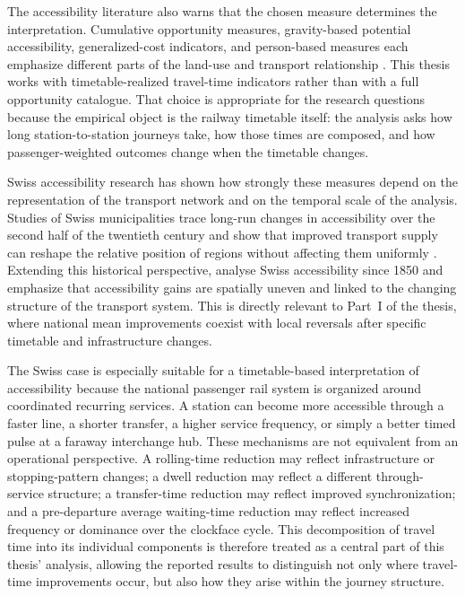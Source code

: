 \documentclass[preprint,12pt]{elsarticle}
\begin{document}
The accessibility literature also warns that the chosen measure determines the interpretation. Cumulative opportunity measures, gravity-based potential accessibility, generalized-cost indicators, and person-based measures each emphasize different parts of the land-use and transport relationship \citep{geurs2004accessibility}. This thesis works with timetable-realized travel-time indicators rather than with a full opportunity catalogue. That choice is appropriate for the research questions because the empirical object is the railway timetable itself: the analysis asks how long station-to-station journeys take, how those times are composed, and how passenger-weighted outcomes change when the timetable changes.

Swiss accessibility research has shown how strongly these measures depend on the representation of the transport network and on the temporal scale of the analysis. Studies of Swiss municipalities trace long-run changes in accessibility over the second half of the twentieth century and show that improved transport supply can reshape the relative position of regions without affecting them uniformly \citep{froehlichTschoppAxhausen2005Accessibility}. Extending this historical perspective, \citet{axhausen2011swissaccessibility} analyse Swiss accessibility since 1850 and emphasize that accessibility gains are spatially uneven and linked to the changing structure of the transport system. This is directly relevant to Part~I of the thesis, where national mean improvements coexist with local reversals after specific timetable and infrastructure changes.

The Swiss case is especially suitable for a timetable-based interpretation of accessibility because the national passenger rail system is organized around coordinated recurring services. A station can become more accessible through a faster line, a shorter transfer, a higher service frequency, or simply a better timed pulse at a faraway interchange hub. These mechanisms are not equivalent from an operational perspective. A rolling-time reduction may reflect infrastructure or stopping-pattern changes; a dwell reduction may reflect a different through-service structure; a transfer-time reduction may reflect improved synchronization; and a pre-departure average waiting-time reduction may reflect increased frequency or dominance over the clockface cycle. This decomposition of travel time into its individual components is therefore treated as a central part of this thesis' analysis, allowing the reported results to distinguish not only where travel-time improvements occur, but also how they arise within the journey structure.
\end{document}
